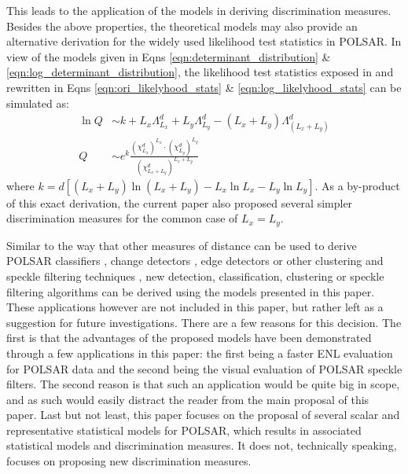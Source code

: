 \documentclass[journal]{IEEEtran}
\begin{document}
This leads to the application of the models in deriving discrimination measures.
Besides the above properties, the theoretical models may also provide an alternative derivation for the widely used likelihood test statistics in POLSAR.
In view of the models given in Eqns \ref{eqn:determinant_distribution} \& \ref{eqn:log_determinant_distribution},
  the likelihood test statistics exposed in \cite{Conradsen_2003_TGRS_4} and rewritten in Eqns \ref{eqn:ori_likelyhood_stats} \& \ref{eqn:log_likelyhood_stats}
can be simulated as:
\begin{align*}
  \ln{Q} &\sim  k + L_x \Lambda^d_{L_x} + L_y \Lambda^d_{L_y} - (L_x + L_y) \Lambda^d_{(L_x + L_y)} \\
  Q &\sim e^k \frac{(\chi^d_{L_x})^{L_x} \cdot (\chi^d_{L_y})^{L_y}}{(\chi^d_{L_x + L_y})^{L_x + L_y}}   
\end{align*}
where $k = d \left[ (L_x + L_y) \ln(L_x + L_y) - L_x \ln{L_x} - L_y \ln{L_y} \right]$.
As a by-product of this exact derivation, the current paper also proposed several simpler discrimination measures for the common case of $L_x=L_y$.

Similar to the way that other measures of distance can be used to derive POLSAR classifiers \cite{Lee_1999_TGRS}, change detectors \cite{Conradsen_2003_TGRS_4}, edge detectors \cite{Schou_2003_TGRS_20} or other clustering and speckle filtering techniques \cite{Le_2010_ACRS} \cite{Le_2011_ACRS}, 
new detection, classification, clustering or speckle filtering algorithms can be derived using the models presented in this paper.
These applications however are not included in this paper, but rather left as a suggestion for future investigations.
There are a few reasons for this decision.
The first is that the advantages of the proposed models have been demonstrated through a few applications in this paper:
  the first being a faster ENL evaluation for POLSAR data and
  the second being the visual evaluation of POLSAR speckle filters.
The second reason is that such an application would be quite big in scope, and as such would easily distract the reader from the main proposal of this paper.
Last but not least, this paper focuses on the proposal of several scalar and representative statistical models for POLSAR, which results in associated statistical models and discrimination measures.
It does not, technically speaking, focuses on proposing new discrimination measures.
\end{document}
